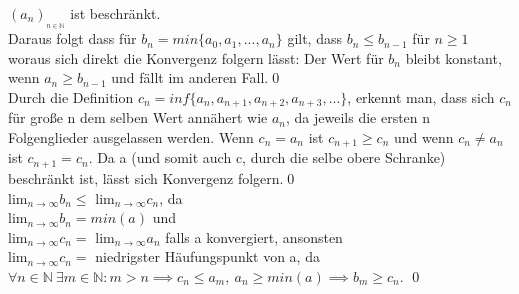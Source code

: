 \((a_n)_{_{n\in \mathbb{N}}}\) ist beschränkt. \\
Daraus folgt dass für \( b_n = min\{a_0,a_1, ... ,a_n\}\) gilt, dass \(b_n \leq b_{n-1}\) für \(  n \geq 1\) woraus
sich direkt die Konvergenz folgern lässt: Der Wert für \(b_n\) bleibt konstant, wenn \(a_n \geq b_{n-1}\) und
fällt im anderen Fall.\qed\\

Durch die Definition \(c_n = inf\{a_{n},a_{n+1},a_{n+2},a_{n+3},...\}\), erkennt man, dass sich \(c_n\) für große n
dem selben Wert annähert wie \(a_n\), da jeweils die ersten n Folgenglieder ausgelassen werden. Wenn \(c_n = a_n\)
ist \(c_{n+1}\geq c_n\) und wenn \(c_n \neq a_n\) ist \(c_{n+1} = c_n\). Da a (und somit auch c, durch die
 selbe obere Schranke) beschränkt ist, lässt sich Konvergenz folgern.\qed\\

lim\(_{n\rightarrow \infty}b_n \leq \) lim\(_{n\rightarrow \infty}c_n \), da\\
lim\(_{n\rightarrow \infty}b_n = min(a)\) und \\
lim\(_{n\rightarrow \infty}c_n = \) lim\(_{n\rightarrow \infty}a_n \) falls a konvergiert, ansonsten\\
lim\(_{n\rightarrow \infty}c_n = \) niedrigster Häufungspunkt von a,  da\\
\(\forall n \in \mathbb{N} \ \exists m \in \mathbb{N} : m>n \implies c_n \leq a_m, \ a_n \geq  min(a) \implies
b_m \geq c_n\). \qed

